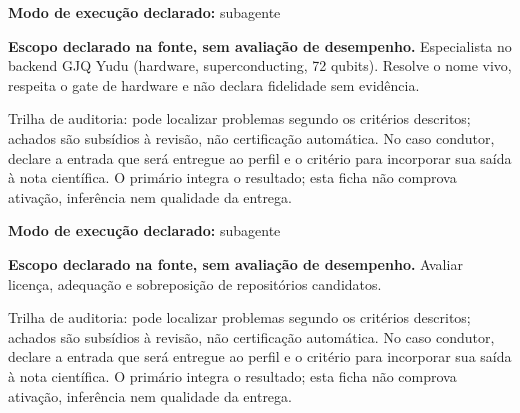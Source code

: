 \begin{arquitetura}
\textbf{Modo de execução declarado:} subagente
\end{arquitetura}


\begin{descricao}
\textbf{Escopo declarado na fonte, sem avaliação de desempenho.}
Especialista no backend GJQ Yudu (hardware, superconducting, 72 qubits). Resolve o nome vivo, respeita o gate de hardware e não declara fidelidade sem evidência.
\end{descricao}

\begin{funcao}
Trilha de auditoria: pode localizar problemas segundo os critérios descritos; achados são subsídios à revisão, não certificação automática. No caso condutor, declare a entrada que será entregue ao perfil e o critério para incorporar sua saída à nota científica. O primário integra o resultado; esta ficha não comprova ativação, inferência nem qualidade da entrega.
\end{funcao}

\begin{arquitetura}
\textbf{Modo de execução declarado:} subagente
\end{arquitetura}


\begin{descricao}
\textbf{Escopo declarado na fonte, sem avaliação de desempenho.}
Avaliar licença, adequação e sobreposição de repositórios candidatos.
\end{descricao}

\begin{funcao}
Trilha de auditoria: pode localizar problemas segundo os critérios descritos; achados são subsídios à revisão, não certificação automática. No caso condutor, declare a entrada que será entregue ao perfil e o critério para incorporar sua saída à nota científica. O primário integra o resultado; esta ficha não comprova ativação, inferência nem qualidade da entrega.
\end{funcao}


